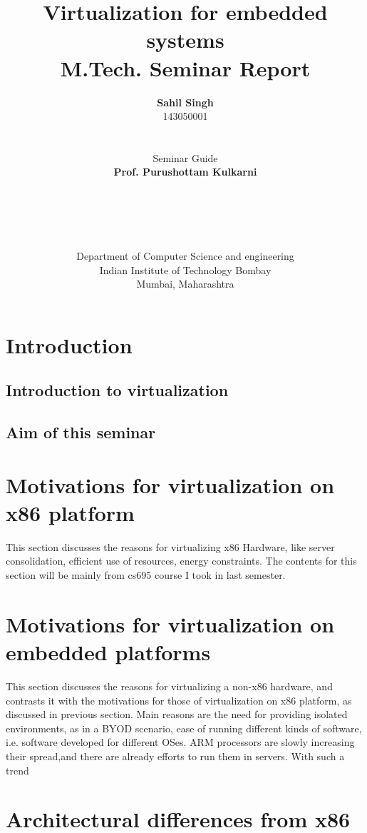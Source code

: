 \documentclass[a4paper,10pt]{article}
\title{\textbf{Virtualization for embedded systems}\\M.Tech. Seminar Report}
\author{\textbf{Sahil Singh}\\143050001\\\\\\Seminar Guide\\\textbf{Prof. Purushottam Kulkarni}\\\\\\\\\\\\Department of Computer Science and engineering\\Indian Institute of Technology Bombay\\Mumbai, Maharashtra}
\date{}
\begin{document}
\maketitle
\newpage
\begin{abstract}
 
\end{abstract}
\tableofcontents

\section{Introduction}
\subsection{Introduction to virtualization}
\subsection{Aim of this seminar}

\section{Motivations for virtualization on x86 platform}
This section discusses the reasons for virtualizing x86 Hardware, like server consolidation, efficient use of resources, energy constraints.
The contents for this section will be mainly from cs695 course I took in last semester.

\section{Motivations for virtualization on embedded platforms}
This section discusses the reasons for virtualizing a non-x86 hardware, and contrasts it with the motivations for those of virtualization on x86 platform, as discussed in previous section.
Main reasons are the need for providing isolated environments, as in a BYOD scenario, ease of running different kinds of software, i.e. software developed for different OSes.
ARM processors are slowly increasing their spread,and there are already efforts to run them in servers. With such a trend 
\section{Architectural differences from x86}
\end{document}
